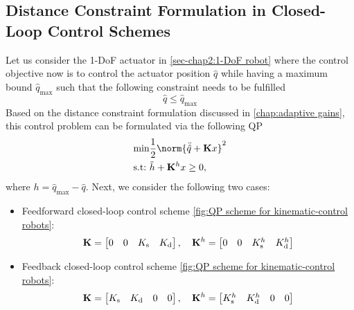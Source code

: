 \subsection{Distance Constraint Formulation in Closed-Loop Control Schemes}\label{subsec-chap2:feedback distance constraint}
Let us consider the 1-DoF actuator in \cref{sec-chap2:1-DoF robot} where the control objective now is to control the actuator position $\hat{q}$ while having a maximum bound $\hat{q}_{\max}$ such that the following constraint needs to be fulfilled 
\begin{equation}\label{eq:constraint 1-DoF}
	\hat{q} \leq \hat{q}_{\max}
\end{equation} 
Based on the distance constraint formulation discussed in \cref{chap:adaptive gains}, this control problem can be formulated via the following QP
\begin{subequations}\label{eq:constrained QP formulated for 1-DoF}
	\begin{align}
			\label{subeq:constrained QP formulated for 1-DoF - costfunction}\min &\frac{1}{2}\norm{\ddot{\hat{q}} + \mathbf{K}x}^2 \\
			\label{subeq:constrained QP formulated for 1-DoF - constraint}\text{s.t:~} &\ddot{h} + \mathbf{K}^h x \geq0,
	\end{align}
\end{subequations}
where $h=\hat{q}_{\max} -\hat{q}$.  Next, we consider the following two cases: 
\begin{itemize}
	\item Feedforward closed-loop control scheme \cref{fig:QP scheme for kinematic-control robots}: 
	\begin{equation}
		\mathbf{K} = \begin{bmatrix}
			0 & 0 & K_{\rm s} & K_{\rm d}
		\end{bmatrix}, \quad \mathbf{K}^h = \begin{bmatrix}
			0 & 0 & K_{\rm s}^h & K_{\rm d}^h
		\end{bmatrix}
	\end{equation}
	\item Feedback closed-loop control scheme \cref{fig:QP scheme for kinematic-control robots}: 
	\begin{equation}\label{eq:feedback control scheme constrained QP}
		\mathbf{K} = \begin{bmatrix}
			K_{\rm s} & K_{\rm d}&  0 & 0 
		\end{bmatrix}, \quad \mathbf{K}^h = \begin{bmatrix}
			K_{\rm s}^h & K_{\rm d}^h & 0 & 0
		\end{bmatrix}
	\end{equation}
\end{itemize}
